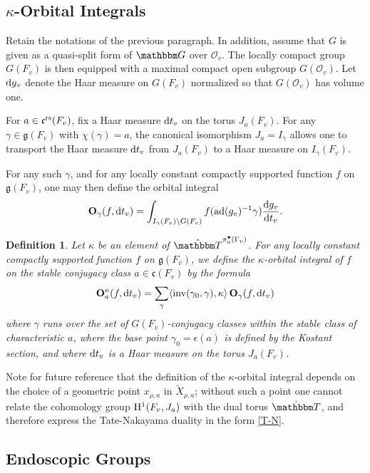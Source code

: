 \documentclass[12pt,english]{smfart}
\numberwithin{equation}{subsection}
\newtheorem{definition}[equation]{Definition}
\theoremstyle{remark}
\newcommand\calO{{\mathscr O}}
\newcommand\frakg{{\mathfrak g}}
\newcommand\frakc{{\mathfrak c}}
\newcommand\GG{{\mathbbm G}}
\newcommand\bbT{{\mathbbm T}}
\newcommand\rmH{{\rm H}}
\newcommand\ad{{\rm ad}}
\newcommand\inv{{\rm inv}}
\newcommand\rs{{\rm rs}}
\begin{document}
\subsection{$\kappa$-Orbital Integrals}\label{subsection : integrales orbitales}

Retain the notations of the previous paragraph. In addition, assume that $G$ is given as a quasi-split form of $\GG$ over $\calO_v$. The locally compact group $G(F_v)$ is then equipped with a maximal compact open subgroup $G(\calO_v)$. Let ${\rm d}g_v$ denote the Haar measure on $G(F_v)$ normalized so that $G(\calO_v)$ has volume one.

For $a\in \frakc^\rs(F_v)$, fix a Haar measure ${\rm d}t_v$ on the torus $J_a(F_v)$. For any $\gamma\in \frakg(F_v)$ with $\chi(\gamma)=a$, the canonical isomorphism $J_a=I_\gamma$ allows one to transport the Haar measure ${\rm d}t_v$ from $J_a(F_v)$ to a Haar measure on $I_\gamma(F_v)$.

For any such $\gamma$, and for any locally constant compactly supported function $f$ on $\frakg(F_v)$, one may then define the orbital integral
$$
{\bf O}_\gamma(f,{\rm d}t_v)=\int_{I_\gamma(F_v) \backslash G(F_v)}
f(\ad(g_v)^{-1}\gamma) \frac{{\rm d}g_v}{ {\rm d}t_v}.
$$

\begin{definition}\label{kappa integrale}
Let $\kappa$ be an element of $\hat \bbT^{\pi_a^\bullet(\Gamma_v)}$. For any locally constant compactly supported function $f$ on $\frakg(F_v)$, we define the $\kappa$-orbital integral of $f$ on the stable conjugacy class $a\in\frakc(F_v)$ by the formula
$$
{\bf O}_a^\kappa(f,{\rm d}t_v)=\sum_{\gamma} \langle
\inv(\gamma_0,\gamma), \kappa \rangle\, {\bf O}_\gamma(f,{\rm d}t_v)
$$
where $\gamma$ runs over the set of $G(F_v)$-conjugacy classes within the stable class of characteristic $a$, where the base point $\gamma_0=\epsilon(a)$ is defined by the Kostant section, and where ${\rm d}t_v$ is a Haar measure on the torus $J_a(F_v)$.
\end{definition}

Note for future reference that the definition of the $\kappa$-orbital integral depends on the choice of a geometric point $x_{\rho,a}$ in $\tilde X_{\rho,a}$; without such a point one cannot relate the cohomology group $\rmH^1(F_v,J_a)$ with the dual torus $\hat\bbT$, and therefore express the Tate-Nakayama duality in the form \ref{T-N}.

\subsection{Endoscopic Groups}\label{subsection : Groupes endoscopiques}
\end{document}

